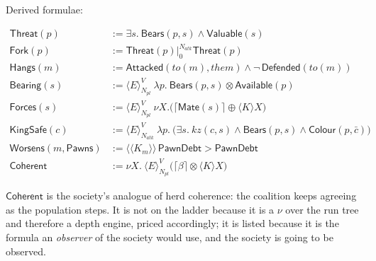 \documentclass[11pt,a4paper]{article}
\theoremstyle{plain}
\theoremstyle{definition}
\theoremstyle{remark}
\newcommand{\KKmod}[1]{\langle\!\langle K_{#1}\rangle\!\rangle}
\newcommand{\Emod}[2]{\langle E\rangle^{#2}_{#1}}
\newcommand{\gsep}[2]{\mathbin{|_{#1}^{#2}}}
\begin{document}
Derived formulae:

\begin{align*}
  \mathsf{Threat}(p) &:= \exists s.\ \mathsf{Bears}(p,s) \wedge \mathsf{Valuable}(s) \\
  \mathsf{Fork}(p) &:= \mathsf{Threat}(p) \gsep{0}{N_{\mathit{atk}}} \mathsf{Threat}(p) \\
  \mathsf{Hangs}(m) &:= \mathsf{Attacked}(\mathit{to}(m),\mathit{them}) \wedge
                        \neg\,\mathsf{Defended}(\mathit{to}(m)) \\
  \mathsf{Bearing}(s) &:= \Emod{N_{\mathit{pl}}}{V}\ \lambda p.\
                        \mathsf{Bears}(p,s) \otimes \mathsf{Available}(p) \\
  \mathsf{Forces}(s) &:= \Emod{N_{\mathit{pl}}}{V}\ \nu X.\big(
                        \lceil \mathsf{Mate}(s) \rceil \oplus \langle K\rangle X\big) \\
  \mathsf{KingSafe}(c) &:= \Emod{N_{\mathit{atk}}}{V}\ \lambda p.\
                        \big(\exists s.\ \mathit{kz}(c,s) \wedge
                        \mathsf{Bears}(p,s) \wedge \mathsf{Colour}(p,\bar c)\big) \\
  \mathsf{Worsens}(m,\mathsf{Pawns}) &:= \KKmod{m}\,\mathsf{PawnDebt}
                        > \mathsf{PawnDebt} \\
  \mathsf{Coherent} &:= \nu X.\ \Emod{N_{\mathit{pl}}}{V}\big(\lceil \beta \rceil
                        \otimes \langle K \rangle X\big)
\end{align*}

$\mathsf{Coherent}$ is the society's analogue of herd coherence: the coalition
keeps agreeing as the population steps. It is not on the ladder because it is a
$\nu$ over the run tree and therefore a depth engine, priced accordingly; it is
listed because it is the formula an \emph{observer} of the society would use,
and the society is going to be observed.
\end{document}
